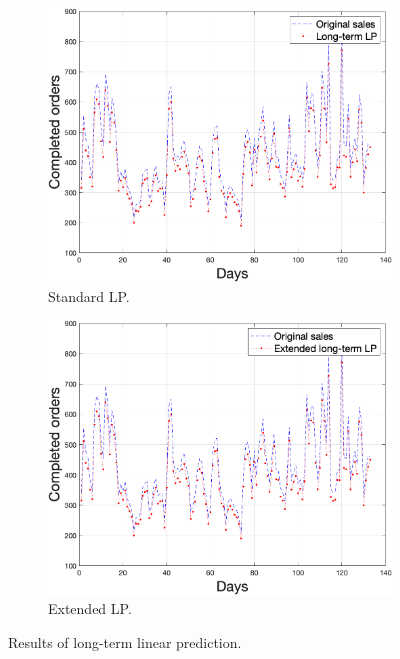     \begin{figure}[h!]
        \centering
        \begin{subfigure}[b]{0.4\textwidth}
            \includegraphics[width=1\textwidth]{figures/expLTLP.png}
            \caption{Standard LP.}
            \label{fig:ltlp}
        \end{subfigure}
        \hspace{0.1\textwidth}
        \begin{subfigure}[b]{0.4\textwidth}
            \includegraphics[width=1\textwidth]{figures/expELTLP.png}
            \caption{Extended LP.}
            \label{fig:eltlp}
        \end{subfigure}
        \caption{Results of long-term linear prediction.}
        \label{fig:longresult}
    \end{figure}
    
